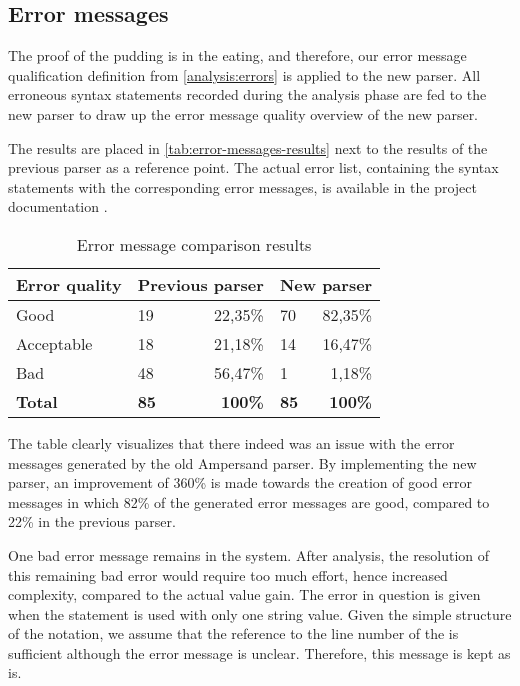 
\subsection{Error messages}
\label{tests:errors}
The proof of the pudding is in the eating, and therefore, our error message qualification definition from \autoref{analysis:errors} is applied to the new parser.
All erroneous syntax statements recorded during the analysis phase are fed to the new parser to draw up the error message quality overview of the new parser.

The results are placed in \autoref{tab:error-messages-results} next to the results of the previous parser as a reference point.
The actual error list, containing the syntax statements with the corresponding error messages, is available in the project documentation .

\begin{table}[h]
  \centering\small
	\begin{tabular}{|l|lr|lr|}\hline
		\rowcolor[HTML]{DDDDDD}
    \textbf{Error quality}  & \multicolumn{2}{|c|}{\textbf{Previous parser}} & \multicolumn{2}{|c|}{\textbf{New parser}} \\\hline\hline
		Good           & 19          & 22,35\%          & 70          & 82,35\%          \\\hline
		Acceptable        & 18          & 21,18\%          & 14          & 16,47\%          \\\hline
		Bad            & 48          & 56,47\%          & 1           &  1,18\%          \\\hline
		\rowcolor[HTML]{DDDDDD}\hline\hline
		\textbf{Total} & \textbf{85} & \textbf{100\%} & \textbf{85} & \textbf{100\%} \\\hline
	\end{tabular}
  \caption{Error message comparison results}
  \label{tab:error-messages-results}
\end{table}

The table clearly visualizes that there indeed was an issue with the error messages generated by the old Ampersand parser.
By implementing the new parser, an improvement of 360\% is made towards the creation of good error messages in which 82\% of the generated error messages are good, compared to 22\% in the previous parser.

One bad error message remains in the system.
After analysis, the resolution of this remaining bad error would require too much effort, hence increased complexity, compared to the actual value gain.
The error in question is given when the  statement is used with only one string value. 
Given the simple structure of the notation, we assume that the reference to the line number of the  is sufficient although the error message is unclear.
Therefore, this message is kept as is.

